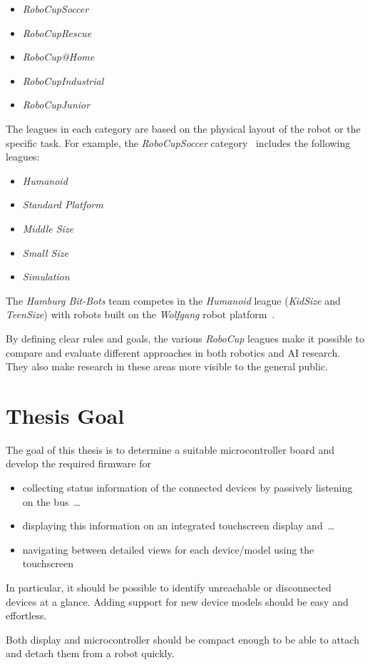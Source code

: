 \begin{itemize}
    \item \textit{RoboCupSoccer}
    \item \textit{RoboCupRescue}
    \item \textit{RoboCup@Home}
    \item \textit{RoboCupIndustrial}
    \item \textit{RoboCupJunior}
\end{itemize}

The leagues in each category are based on the physical layout of the robot or the specific task. For
example, the \textit{RoboCupSoccer} category~\cite{robocup-soccer} includes the following leagues:

\begin{itemize}
    \item \textit{Humanoid}
    \item \textit{Standard Platform}
    \item \textit{Middle Size}
    \item \textit{Small Size}
    \item \textit{Simulation}
\end{itemize}

The \textit{Hamburg Bit-Bots} team competes in the \textit{Humanoid} league (\textit{KidSize} and
\textit{TeenSize}) with robots built on the \textit{Wolfgang} robot platform~\cite{robocup-humanoid-teams}.

By defining clear rules and goals, the various \textit{RoboCup} leagues make it possible to compare
and evaluate different approaches in both robotics and AI research. They also make research in these
areas more visible to the general public.

\section{Thesis Goal}
\label{introduction/thesis-goal}

The goal of this thesis is to determine a suitable microcontroller board and develop
the required firmware for

\begin{itemize}
    \item collecting status information of the connected devices by passively listening on the bus~\dots
    \item displaying this information on an integrated touchscreen display and~\dots
    \item navigating between detailed views for each device/model using the touchscreen
\end{itemize}

In particular, it should be possible to identify unreachable or disconnected devices at a glance.
Adding support for new device models should be easy and effortless.

Both display and microcontroller should be compact enough to be able to attach and detach them
from a robot quickly.
